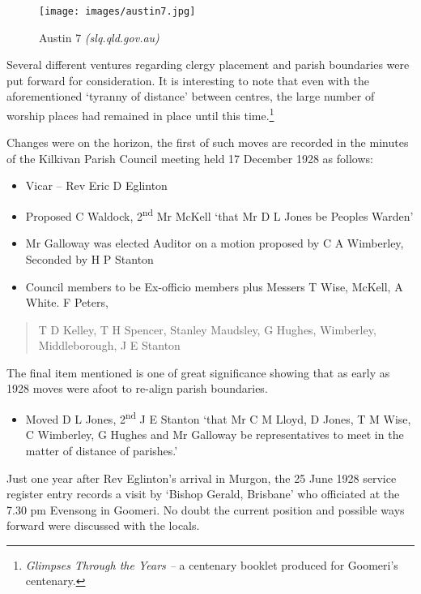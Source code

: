 \begin{figure}[!h]
\begin{center}
\texttt{[image: images/austin7.jpg]}
\caption{Austin 7 \emph{(slq.qld.gov.au)}}
\end{center}
\end{figure}


Several different ventures regarding clergy placement and parish
boundaries were put forward for consideration. It is interesting to note
that even with the aforementioned `tyranny of distance' between centres,
the large number of worship places had remained in place until this
time.\footnote{\emph{Glimpses Through the Years --} a centenary booklet
  produced for Goomeri's centenary.}

Changes were on the horizon, the first of such moves are recorded in the
minutes of the Kilkivan Parish Council meeting held 17 December 1928 as
follows:

\begin{itemize}
\item
  Vicar -- Rev Eric D Eglinton
\item
  Proposed C Waldock, 2\textsuperscript{nd} Mr McKell `that Mr D L Jones
  be Peoples Warden'
\item
  Mr Galloway was elected Auditor on a motion proposed by C A Wimberley,
  Seconded by H P Stanton
\item
  Council members to be Ex-officio members plus Messers T Wise, McKell,
  A White. F Peters,
\end{itemize}

\begin{quote}
T D Kelley, T H Spencer, Stanley Maudsley, G Hughes, Wimberley,
Middleborough, J E Stanton
\end{quote}

The final item mentioned is one of great significance showing that as
early as 1928 moves were afoot to re-align parish boundaries.

\begin{itemize}
\item
  Moved D L Jones, 2\textsuperscript{nd} J E Stanton `that Mr C M Lloyd,
  D Jones, T M Wise, C Wimberley, G Hughes and Mr Galloway be
  representatives to meet in the matter of distance of parishes.'
\end{itemize}

Just one year after Rev Eglinton's arrival in Murgon, the 25 June 1928
service register entry records a visit by `Bishop Gerald, Brisbane' who
officiated at the 7.30 pm Evensong in Goomeri. No doubt the current
position and possible ways forward were discussed with the locals.


